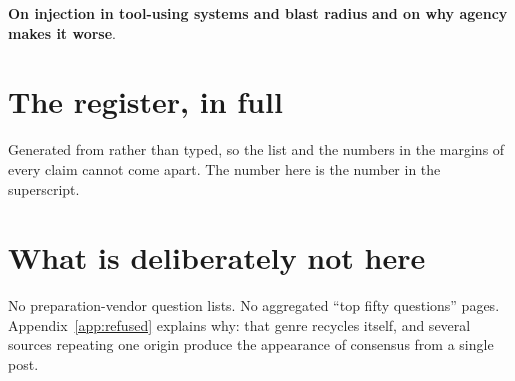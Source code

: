 \textbf{On injection in tool-using systems and blast
radius} \textbf{and on why agency makes it
worse}.

\section{The register, in full}

Generated from  rather than typed, so the list and the
numbers in the margins of every claim cannot come apart. The number here is
the number in the superscript.

\kitsourcetable

\section{What is deliberately not here}

No preparation-vendor question lists. No aggregated ``top fifty questions''
pages. Appendix~\ref{app:refused} explains why: that genre recycles itself, and
several sources repeating one origin produce the appearance of consensus from a
single post.

